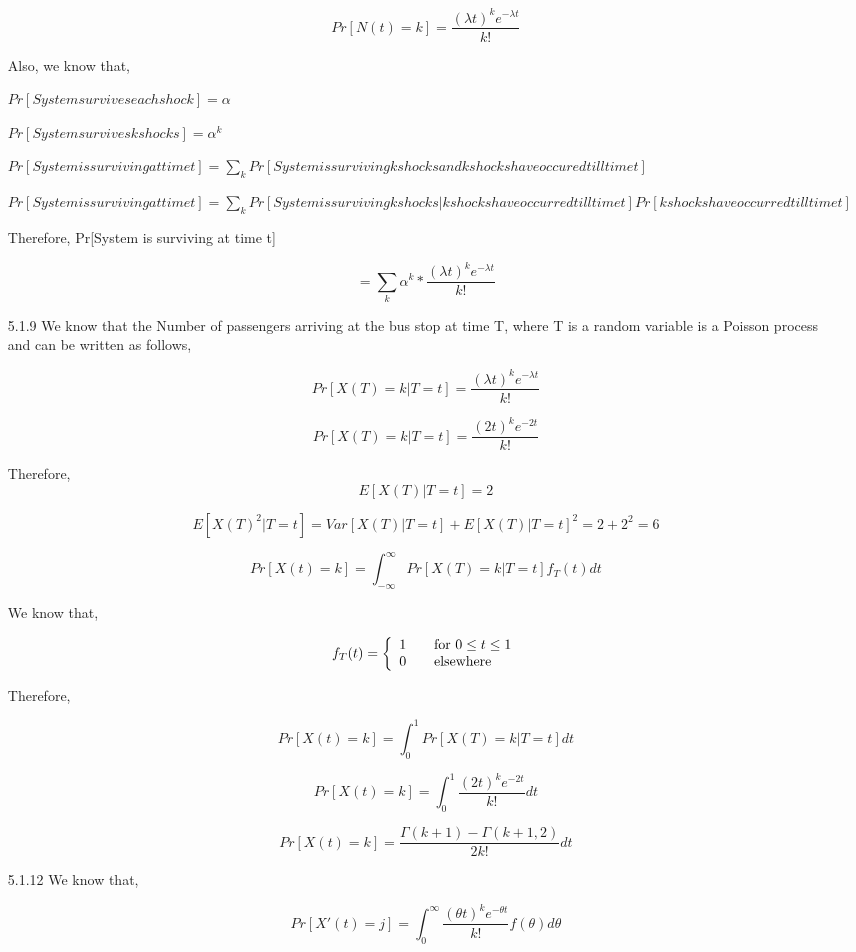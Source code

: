 \documentclass[a4paper,oneside,12pt]{report}
\begin{document}
\begin{enumerate}
	$$Pr[N(t) = k] = \frac{(\lambda t)^k e^{-\lambda t}}{k!}$$
	
	Also, we know that,
	
	$Pr[System survives each shock] = \alpha$
	
	$Pr[System survives k shocks] = \alpha^{k}$
	
	$Pr[System is surviving at time t] = \sum_k{Pr[System is surviving k shocks and k shocks have occured till time t]}$
	
	$Pr[System is surviving at time t] = \sum_k{Pr[System is surviving k shocks|k shocks have occurred till time t] Pr[k shocks have occurred till time t]}$
	
	Therefore, Pr[System is surviving at time t]
	
	$$ = \sum_k{\alpha^k * \frac{(\lambda t)^k e^{-\lambda t}}{k!}}$$
	
	\item[5.1.9] We know that the Number of passengers arriving at the bus stop at time T, where T is a random variable  is a Poisson process and can be written as follows,
	
	$$Pr[X(T) = k|T = t] = \frac{(\lambda t)^k e^{-\lambda t}}{k!}$$
	
	$$Pr[X(T) = k|T = t] = \frac{(2 t)^k e^{-2 t}}{k!}$$
	
	Therefore, $$E[X(T)|T = t] = 2$$
	
	$$E[X(T)^2|T = t] = Var[X(T)|T = t] + E[X(T)|T = t]^2 = 2 + 2^2 = 6$$
	
	$$Pr[X(t) = k] = \int_{-\infty}^{\infty}{Pr[X(T) = k|T = t] f_T(t) dt}$$
	
	We know that,
	
	\[f_T(t) = \left\{ 
  \begin{array}{l l}
    1 & \quad \text{for $0 \leq t \leq 1$}\\
    0 & \quad \text{elsewhere}
  \end{array} \right.\]
	
	Therefore,
	
	$$Pr[X(t) = k] = \int_0^1{Pr[X(T) = k|T = t] dt}$$
	
	$$Pr[X(t) = k] = \int_0^1{\frac{(2 t)^k e^{-2 t}}{k!} dt}$$
	
	$$Pr[X(t) = k] = \frac{\Gamma(k + 1) - \Gamma(k + 1, 2)}{2k!} dt$$
	
	\item[5.1.12] We know that,
	
	$$Pr[X'(t) = j] = \int_0^{\infty}\frac{(\theta t)^k e^{-\theta t}}{k!} f(\theta) d\theta$$
	

\end{enumerate}
\end{document}

